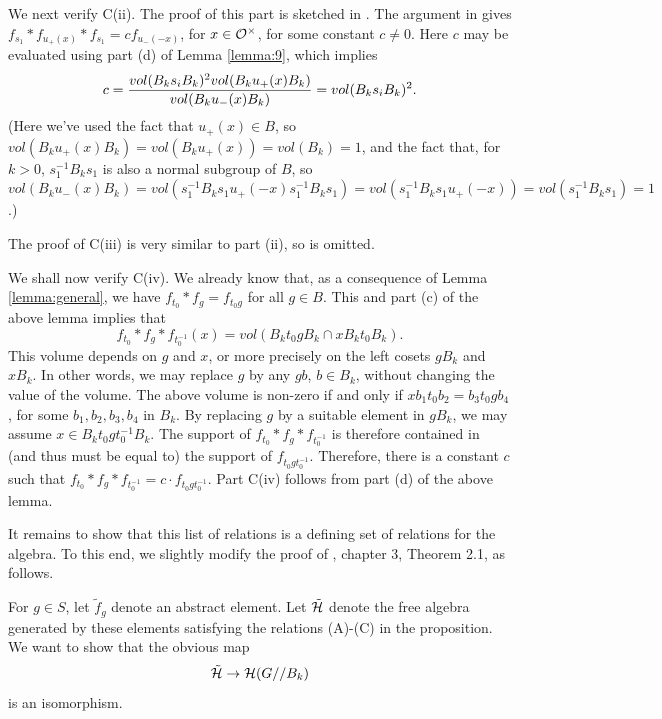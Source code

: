 We next verify C(ii). The proof of this part is sketched
in \cite{H}. The argument in \cite{H} gives
$f_{s_1}*f_{u_+(x)}*f_{s_1}=cf_{u_-(-x)}$, for
$x\in {\cal O}^\times$, for some constant $c\not= 0$.
Here $c$ may be evaluated using
part (d) of Lemma \ref{lemma:9}, which implies
\[
c={ vol(B_k s_i B_k)^2vol(B_k u_+(x) B_k)\over 
vol(B_k u_-(x) B_k)}=vol(B_k s_i B_k)^2.
\]
(Here we've used the fact that $u_+(x)\in B$, so 
$vol(B_k u_+(x) B_k)=vol(B_k u_+(x) )=vol(B_k)=1$, and the fact 
that, for $k>0$, $s_1^{-1}B_ks_1$ is also a normal subgroup of $B$,
so $vol(B_k u_-(x) B_k)=
vol(s_1^{-1}B_ks_1 u_+(-x) s_1^{-1}B_ks_1)=
vol(s_1^{-1}B_ks_1 u_+(-x))=vol(s_1^{-1}B_ks_1)=1$.)

The proof of C(iii) is very similar to part (ii), so
is omitted.

We shall now verify C(iv). We already know that, as a consequence of 
Lemma \ref{lemma:general}, we have $f_{t_0}*f_g=f_{t_0g}$
for all $g\in B$. This and part (c) of the above lemma implies that
\[
f_{t_0}*f_g*f_{t_0^{-1}}(x)=vol(B_kt_0gB_k\cap xB_kt_0B_k).
\]
This volume depends on $g$ and $x$, or more precisely on the
left cosets $gB_k$ and $xB_k$. In other words, we may
replace $g$ by any $gb$, $b\in B_k$, without changing the value
of the volume. The above volume is non-zero if and only if
$xb_1t_0b_2=b_3t_0gb_4$, for some $b_1,b_2,b_3,b_4$ in $B_k$.
By replacing $g$ by a suitable element in $gB_k$, we may assume
$x\in B_kt_0gt_0^{-1}B_k$. The support of $f_{t_0}*f_g*f_{t_0^{-1}}$
is therefore contained in (and thus must be equal to)
the support of $f_{t_0gt_0^{-1}}$. Therefore, there is a constant $c$
such that $f_{t_0}*f_g*f_{t_0^{-1}}=c\cdot f_{t_0gt_0^{-1}}$.
Part C(iv) follows from part (d) of the above lemma.

It remains to show that this list of relations is a 
defining set of relations for the algebra. To this end, 
we slightly modify the proof of \cite{H}, chapter 3, Theorem 2.1,
as follows.

For $g\in S$, let $\tilde{f}_g$ denote an abstract element.
Let $\tilde{\cal H}$ denote the free algebra generated by these 
elements satisfying the relations (A)-(C) in the 
proposition. We want to show that the obvious map
\begin{equation}
\tilde{\cal H}\rightarrow {\cal H}(G//B_k)
\label{eq:obvious}
\end{equation}
is an isomorphism. 

